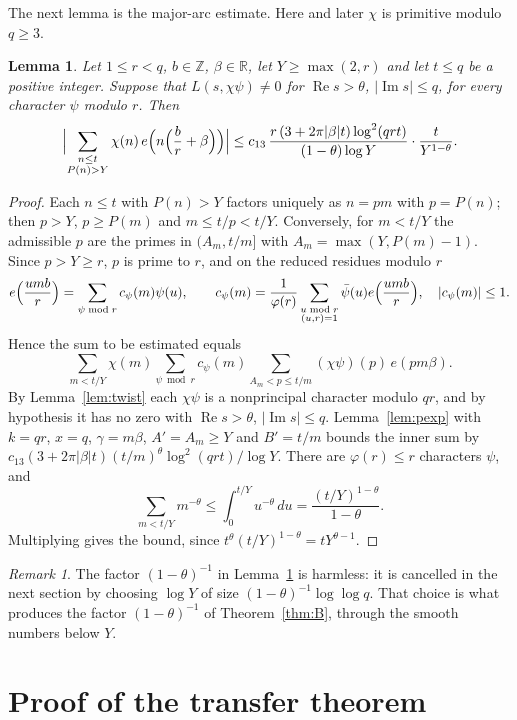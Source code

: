 \documentclass[11pt,a4paper,reqno]{amsart}
\newtheorem{lemma}[theorem]{Lemma}
\theoremstyle{remark}
\newtheorem{remark}[theorem]{Remark}
\numberwithin{equation}{section}
\renewcommand{\Re}{\operatorname{Re}}
\renewcommand{\Im}{\operatorname{Im}}
\newcommand{\R}{\mathbb{R}}
\newcommand{\Z}{\mathbb{Z}}
\begin{document}
The next lemma is the major-arc estimate. Here and later $\chi$ is primitive modulo $q\ge3$.

\begin{lemma}\label{lem:major}
Let $1\le r<q$, $b\in\Z$, $\beta\in\R$, let $Y\ge\max(2,r)$ and let $t\le q$ be a positive integer. Suppose that $L(s,\chi\psi)\ne0$ for $\Re s>\theta$, $|\Im s|\le q$, for every character $\psi$ modulo $r$. Then
\[
  \Bigl|\sum_{\substack{n\le t\\P(n)>Y}}\chi(n)\,e\Bigl(n\Bigl(\frac br+\beta\Bigr)\Bigr)\Bigr|
  \le c_{13}\,\frac{r\,(3+2\pi|\beta|t)\log^2(qrt)}{(1-\theta)\log Y}\cdot\frac t{Y^{1-\theta}}.
\]
\end{lemma}

\begin{proof}
Each $n\le t$ with $P(n)>Y$ factors uniquely as $n=pm$ with $p=P(n)$; then $p>Y$, $p\ge P(m)$ and $m\le t/p<t/Y$. Conversely, for $m<t/Y$ the admissible $p$ are the primes in $(A_m,t/m]$ with $A_m=\max(Y,P(m)-1)$. Since $p>Y\ge r$, $p$ is prime to $r$, and on the reduced residues modulo $r$
\[
  e\Bigl(\frac{umb}r\Bigr)=\sum_{\psi\bmod r}c_\psi(m)\psi(u),\qquad c_\psi(m)=\frac1{\varphi(r)}\sum_{\substack{u\bmod r\\(u,r)=1}}\bar\psi(u)e\Bigl(\frac{umb}r\Bigr),\quad|c_\psi(m)|\le1.
\]
Hence the sum to be estimated equals
\[
  \sum_{m<t/Y}\chi(m)\sum_{\psi\bmod r}c_\psi(m)\sum_{A_m<p\le t/m}(\chi\psi)(p)\,e(pm\beta).
\]
By Lemma~\ref{lem:twist} each $\chi\psi$ is a nonprincipal character modulo $qr$, and by hypothesis it has no zero with $\Re s>\theta$, $|\Im s|\le q$. Lemma~\ref{lem:pexp} with $k=qr$, $x=q$, $\gamma=m\beta$, $A'=A_m\ge Y$ and $B'=t/m$ bounds the inner sum by $c_{13}(3+2\pi|\beta|t)(t/m)^\theta\log^2(qrt)/\log Y$. There are $\varphi(r)\le r$ characters $\psi$, and
\[
  \sum_{m<t/Y}m^{-\theta}\le\int_0^{t/Y}u^{-\theta}\,du=\frac{(t/Y)^{1-\theta}}{1-\theta}.
\]
Multiplying gives the bound, since $t^\theta(t/Y)^{1-\theta}=tY^{\theta-1}$.
\end{proof}

\begin{remark}
The factor $(1-\theta)^{-1}$ in Lemma~\ref{lem:major} is harmless: it is cancelled in the next section by choosing $\log Y$ of size $(1-\theta)^{-1}\log\log q$. That choice is what produces the factor $(1-\theta)^{-1}$ of Theorem~\ref{thm:B}, through the smooth numbers below $Y$.
\end{remark}
\section{Proof of the transfer theorem}\label{sec:transfer}
\end{document}
